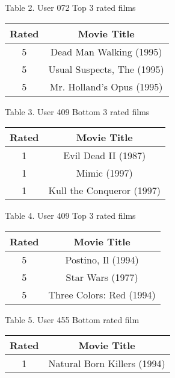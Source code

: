 \documentclass[10pt,letterpaper]{article}
\begin{document}
Table 2. User 072 Top 3 rated films\\
\begin{center}
  \begin{tabular}{ | c | c }
    \hline
     Rated & Movie Title\\ \hline
     5 & Dead Man Walking (1995)\\ \hline
     5 & Usual Suspects, The (1995)\\ \hline
     5 & Mr. Holland's Opus (1995)\\ \hline
    \hline
  \end{tabular}
\end{center}

Table 3. User 409 Bottom 3 rated films\\
\begin{center}
  \begin{tabular}{ | c | c }
    \hline
     Rated & Movie Title\\ \hline
     1 & Evil Dead II (1987)\\ \hline
     1 & Mimic (1997)\\ \hline
     1 & Kull the Conqueror (1997)\\ \hline
    \hline
  \end{tabular}
\end{center}

Table 4. User 409 Top 3 rated films\\
\begin{center}
  \begin{tabular}{ | c | c }
    \hline
     Rated & Movie Title\\ \hline
     5 & Postino, Il (1994)\\ \hline
     5 & Star Wars (1977)\\ \hline
     5 & Three Colors: Red (1994)\\ \hline
    \hline
  \end{tabular}
\end{center}

Table 5. User 455 Bottom rated film\\
\begin{center}
  \begin{tabular}{ | c | c }
    \hline
     Rated & Movie Title\\ \hline
     1 & Natural Born Killers (1994)\\ \hline
    \hline
  \end{tabular}
\end{center}
\end{document}
